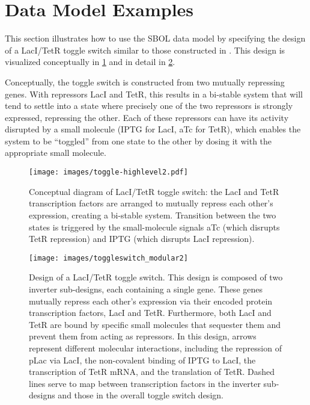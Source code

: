 \section{Data Model Examples}
\label{sec:examples}


This section illustrates how to use the SBOL data model by specifying the design of a LacI/TetR toggle switch similar to those constructed in \cite{Gardner2000}. This design is visualized conceptually in \ref{images:toggle} and in detail in \ref{images:toggleswitch_modular}. 

Conceptually, the toggle switch is constructed from two mutually repressing genes.  
With repressors LacI and TetR, this results in a bi-stable system that will tend to settle into a state where precisely one of the two repressors is strongly expressed, repressing the other.
Each of these repressors can have its activity disrupted by a small molecule (IPTG for LacI, aTc for TetR), which enables the system to be ``toggled'' from one state to the other by dosing it with the appropriate small molecule.


\begin{figure}[ht]
\begin{center}
\texttt{[image: images/toggle-highlevel2.pdf]}
\caption[]{Conceptual diagram of LacI/TetR toggle switch: the LacI 
  and TetR transcription factors are arranged to mutually repress each other's expression, 
  creating a bi-stable system.  Transition between the two states
  is triggered by the small-molecule signals aTc (which disrupts TetR
  repression) and IPTG (which disrupts LacI repression).}
\label{images:toggle}
\end{center}
\end{figure}

\begin{figure}[ht]
\begin{center}
\texttt{[image: images/toggleswitch\_modular2]}
\caption[]{Design of a LacI/TetR toggle switch. This design is composed of two inverter sub-designs, each containing a single gene. These genes mutually repress each other's expression via their encoded protein transcription factors, LacI and TetR. Furthermore, both LacI and TetR are bound by specific small molecules that sequester them and prevent them from acting as repressors. In this design, arrows represent different molecular interactions, including the repression of pLac via LacI, the non-covalent binding of IPTG to LacI, the transcription of TetR mRNA, and the translation of TetR. Dashed lines serve to map between transcription factors in the inverter sub-designs and those in the overall toggle switch design.}
\label{images:toggleswitch_modular}
\end{center}
\end{figure}


